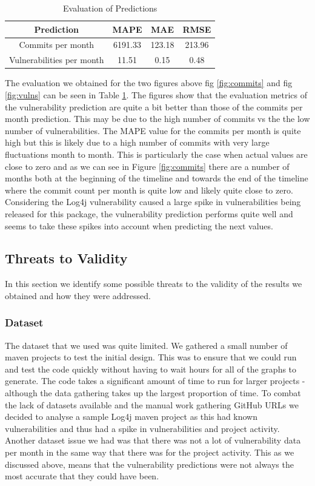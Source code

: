 \documentclass[conference]{IEEEtran}
\begin{document}
\begin{table}[H]
 \caption{Evaluation of Predictions}
\label{evaluations}
\begin{center}
\begin{tabular}{|c|c|c|c|}
\hline
    \textbf{Prediction} & \textbf{MAPE} & \textbf{MAE} & \textbf{RMSE} \\ \hline
    Commits per month & 6191.33 & 123.18 & 213.96 \\ \hline
    Vulnerabilities per month & 11.51 & 0.15 & 0.48 \\ \hline
\end{tabular}
\end{center}
\end{table}

The evaluation we obtained for the two figures above fig \ref{fig:commits} and fig \ref{fig:vulns} can be seen in Table \ref{evaluations}. The figures show that the evaluation metrics of the vulnerability prediction are quite a bit better than those of the commits per month prediction. This may be due to the high number of commits vs the the low number of vulnerabilities. The MAPE value for the commits per month is quite high but this is likely due to a high number of commits with very large fluctuations month to month. This is particularly the case when actual values are close to zero and as we can see in Figure \ref{fig:commits} there are a number of months both at the beginning of the timeline and towards the end of the timeline where the commit count per month is quite low and likely quite close to zero. Considering the Log4j vulnerability caused a large spike in vulnerabilities being released for this package, the vulnerability prediction performs quite well and seems to take these spikes into account when predicting the next values. 

\subsection{Threats to Validity}
In this section we identify some possible threats to the validity of the results we obtained and how they were addressed. 

\subsubsection{Dataset}
The dataset that we used was quite limited. We gathered a small number of maven projects to test the initial design. This was to ensure that we could run and test the code quickly without having to wait hours for all of the graphs to generate. The code takes a significant amount of time to run for larger projects - although the data gathering takes up the largest proportion of time. To combat the lack of datasets available and the manual work gathering GitHub URLs we decided to analyse a sample Log4j maven project as this had known vulnerabilities and thus had a spike in vulnerabilities and project activity. Another dataset issue we had was that there was not a lot of vulnerability data per month in the same way that there was for the project activity. This as we discussed above, means that the vulnerability predictions were not always the most accurate that they could have been. 
\end{document}
